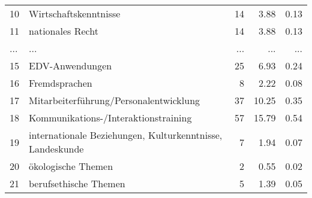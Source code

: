 \begin{longtable}{lXrrr}
        10 & \multicolumn{1}{X}{Wirtschaftskenntnisse} & %
          \num{14} &
          \num[round-mode=places,round-precision=2]{3.88} &
          \num[round-mode=places,round-precision=2]{0.13} \\
        11 & \multicolumn{1}{X}{nationales Recht} & %
          \num{14} &
          \num[round-mode=places,round-precision=2]{3.88} &
          \num[round-mode=places,round-precision=2]{0.13} \\
       ... & ... & ... & ... & ... \\
        15 & \multicolumn{1}{X}{EDV-Anwendungen} & %
          \num{25} &
          \num[round-mode=places,round-precision=2]{6.93} &
          \num[round-mode=places,round-precision=2]{0.24} \\

        16 & \multicolumn{1}{X}{Fremdsprachen} & %
          \num{8} &
          \num[round-mode=places,round-precision=2]{2.22} &
          \num[round-mode=places,round-precision=2]{0.08} \\

        17 & \multicolumn{1}{X}{Mitarbeiterführung/Personalentwicklung} & %
          \num{37} &
          \num[round-mode=places,round-precision=2]{10.25} &
          \num[round-mode=places,round-precision=2]{0.35} \\

        18 & \multicolumn{1}{X}{Kommunikations-/Interaktionstraining} & %
          \num{57} &
          \num[round-mode=places,round-precision=2]{15.79} &
          \num[round-mode=places,round-precision=2]{0.54} \\

        19 & \multicolumn{1}{X}{internationale Beziehungen, Kulturkenntnisse, Landeskunde} & %
          \num{7} &
          \num[round-mode=places,round-precision=2]{1.94} &
          \num[round-mode=places,round-precision=2]{0.07} \\

        20 & \multicolumn{1}{X}{ökologische Themen} & %
          \num{2} &
          \num[round-mode=places,round-precision=2]{0.55} &
          \num[round-mode=places,round-precision=2]{0.02} \\

        21 & \multicolumn{1}{X}{berufsethische Themen} & %
          \num{5} &
          \num[round-mode=places,round-precision=2]{1.39} &
          \num[round-mode=places,round-precision=2]{0.05} \\


\end{longtable}
